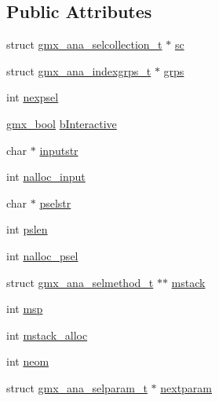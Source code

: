 \subsection*{\-Public \-Attributes}
\begin{DoxyCompactItemize}
\item 
struct \hyperlink{structgmx__ana__selcollection__t}{gmx\-\_\-ana\-\_\-selcollection\-\_\-t} $\ast$ \hyperlink{structgmx__sel__lexer__t_a82dc052b54870d8ea2770036c241af08}{sc}
\item 
struct \hyperlink{structgmx__ana__indexgrps__t}{gmx\-\_\-ana\-\_\-indexgrps\-\_\-t} $\ast$ \hyperlink{structgmx__sel__lexer__t_aef870a37623dcafbd547da645d16f891}{grps}
\item 
int \hyperlink{structgmx__sel__lexer__t_a5695b1b723a0613de0aed182033788bf}{nexpsel}
\item 
\hyperlink{include_2types_2simple_8h_a8fddad319f226e856400d190198d5151}{gmx\-\_\-bool} \hyperlink{structgmx__sel__lexer__t_a2f3bd0ebb410c8a54f90d42357d68fdf}{b\-Interactive}
\item 
char $\ast$ \hyperlink{structgmx__sel__lexer__t_a3d8591710e5e07602dcbc1d2b511661e}{inputstr}
\item 
int \hyperlink{structgmx__sel__lexer__t_a9cddfb4c17c03f825cc4ca28befbb02b}{nalloc\-\_\-input}
\item 
char $\ast$ \hyperlink{structgmx__sel__lexer__t_aecab18de208e7f67e3122ae29178f560}{pselstr}
\item 
int \hyperlink{structgmx__sel__lexer__t_a8a8b8fba445d21818367f101c5253aa1}{pslen}
\item 
int \hyperlink{structgmx__sel__lexer__t_a406c46c4363efbb6334142facff6091e}{nalloc\-\_\-psel}
\item 
struct \hyperlink{structgmx__ana__selmethod__t}{gmx\-\_\-ana\-\_\-selmethod\-\_\-t} $\ast$$\ast$ \hyperlink{structgmx__sel__lexer__t_a3e71cb042172f69ab46c052232e40366}{mstack}
\item 
int \hyperlink{structgmx__sel__lexer__t_aa043cc5fb256982c5cdaf2f73b23c45f}{msp}
\item 
int \hyperlink{structgmx__sel__lexer__t_afaa0845d2a641ae5ef0cce5fb34cd8a2}{mstack\-\_\-alloc}
\item 
int \hyperlink{structgmx__sel__lexer__t_a5c19cf6e921545d45e0843fc5e29458a}{neom}
\item 
struct \hyperlink{structgmx__ana__selparam__t}{gmx\-\_\-ana\-\_\-selparam\-\_\-t} $\ast$ \hyperlink{structgmx__sel__lexer__t_aa5198ac84c3303505202a7b6b6cb17d1}{nextparam}
\item 
$$
\end{DoxyCompactItemize}
